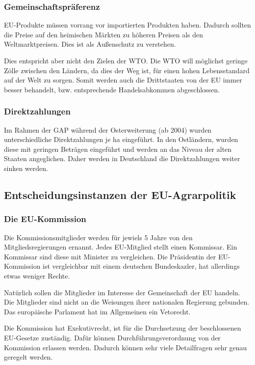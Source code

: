 \documentclass[11pt]{scrbook}
\begin{document}
\subsubsection{Gemeinschaftspräferenz}
\ac{EU}-Produkte müssen vorrang vor importierten Produkten haben.
Dadurch sollten die Preise auf den heimischen Märkten zu höheren Preisen als den Weltmarktpreisen.
Dies ist als Außenschutz zu verstehen.

Dies entspricht aber nicht den Zielen der \ac{WTO}.
Die \ac{WTO} will möglichst geringe Zölle zwischen den Ländern, da dies der Weg ist, für einen hohen Lebensstandard auf der Welt zu sorgen.
Somit werden auch die Drittstaaten von der \ac{EU} immer besser behandelt, bzw. entsprechende Handelsabkommen abgeschlossen.

\subsubsection{Direktzahlungen}
Im Rahmen der \ac{GAP} während der Osterweiterung (ab 2004) wurden unterschiedliche Direktzahlungen je ha eingeführt.
In den Ostländern, wurden diese mit geringen Beträgen eingeführt und werden an das Niveau der alten Staaten angeglichen.
Daher werden in Deutschland die Direktzahlungen weiter sinken werden.

\subsection{Entscheidungsinstanzen der \ac{EU}-Agrarpolitik}

\subsubsection{Die \ac{EU}-Kommission}
Die Kommissionsmitglieder werden für jewiels 5 Jahre von den Mitgliedsregierungen ernannt.
Jedes \ac{EU}-Mitglied stellt einen Kommissar. Ein Kommissar sind diese mit Minister zu vergleichen.
Die Präsidentin der \ac{EU}-Kommission ist vergleichbar mit einem deutschen Bundeskazler, hat allerdings etwas weniger Rechte.

Natürlich sollen die Mitglieder im Interesse der Gemeinschaft der \ac{EU} handeln.
Die Mitglieder sind nicht an die Weisungen ihrer nationalen Regierung gebunden.
Das europäische Parlament hat im Allgemeinen ein Vetorecht.

Die Kommission hat Exekutivrecht, ist für die Durchsetzung der beschlossenen \ac{EU}-Gesetze zuständig.
Dafür können Durchführungsverordnung von der Kommission erlassen werden.
Dadurch können sehr viele Detailfragen sehr genau geregelt werden.
\end{document}
